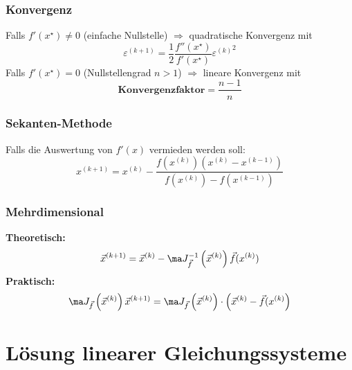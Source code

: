 \documentclass[fs, footer]{latex4ei}
\begin{document}
\begin{multicols*}{4}
{\subsubsection{Konvergenz}
Falls $f'(x^\star) \ne 0$ (einfache Nullstelle) $\Rightarrow$ quadratische Konvergenz mit
\begin{equation*}
	\varepsilon^{(k + 1)} = \frac{1}{2} \frac{f''(x^\star)}{f'(x^\star)} {\varepsilon^{(k)}}^2
\end{equation*}
Falls $f'(x^\star) = 0$ (Nullstellengrad $n > 1$) $\Rightarrow$ lineare Konvergenz mit
\begin{equation*}
\textbf{Konvergenzfaktor} = \frac{n-1}{n}
\end{equation*}

\subsubsection{Sekanten-Methode}
Falls die Auswertung von $f'(x)$ vermieden werden soll:
\begin{equation*}
	x^{(k + 1)} = x^{(k)} - \frac{f(x^{(k)}) \left( x^{(k)} - x^{(k - 1)} \right)}{f(x^{(k)}) - f(x^{(k - 1)})}
\end{equation*}

\subsubsection{Mehrdimensional}
\textbf{Theoretisch:}
\begin{equation*}
	\vec x^{(k + 1)} = \vec x^{(k)} - \ma J^{-1}_{\vec f}\left (\vec x^{(k)}\right ) \vec f(x^{(k)})
\end{equation*}
\textbf{Praktisch:}
\begin{equation*}
	\ma J_{\vec f}\left (\vec x^{(k)}\right ) \vec x^{(k + 1)} = \ma J_{\vec f}\left (\vec x^{(k)}\right )\cdot \left (\vec x^{(k)} - \vec f(x^{(k)}\right )
\end{equation*}
}

\section{Lösung linearer Gleichungssysteme}


\end{multicols*}
\end{document}

